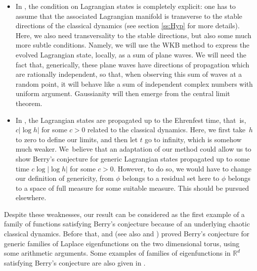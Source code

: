 \documentclass[10pt]{amsart}
\theoremstyle{plain}
\theoremstyle{definition}
\newcommand{\R}{\mathbb{R}}
\begin{document}
\begin{itemize}
\item In \cite{Schu}, the condition on Lagrangian states is completely explicit: one has to assume that the associated Lagrangian manifold is transverse to the stable directions of the classical dynamics (see section \ref{ss:Hyp} for more details). Here, we also need transversality to the stable directions, but also some much more subtle conditions. Namely, we will use the WKB method to express the evolved Lagrangian state, locally, as a sum of plane waves. We will need the fact that, generically, these plane waves have directions of propagation which are rationally independent, so that, when observing this sum of waves at a random point, it will behave like a sum of independent complex numbers with uniform argument. Gaussianity will then emerge from the central limit theorem.

\item In \cite{Schu}, the Lagrangian states are propagated up to the Ehrenfest time, that~is, $c |\log h|$ for some $c>0$ related to the classical dynamics. Here, we first take~$h$ to zero to define our limits, and then let $t$ go to infinity, which is somehow much weaker. We~believe that an adaptation of our method could allow us to show Berry's conjecture for generic Lagrangian states propagated up to some time $c \log |\log h|$ for some $c>0$. However, to do so, we would have to change our definition of genericity, from $\phi$ belongs to a residual set here to $\phi$ belongs to a space of full measure for some suitable measure. This should be pursued elsewhere.
\end{itemize}

Despite these weaknesses, our result can be considered as the first example of a family of functions satisfying Berry's conjecture because of an underlying chaotic classical dynamics. Before that, \cite{Bou} and \cite{BW} (see also \cite{LWL} and \cite{Sar}) proved Berry's conjecture for generic families of Laplace eigenfunctions on the two dimensional torus, using some arithmetic arguments. Some examples of families of eigenfunctions in $\R^d$ satisfying Berry's conjecture are also given in \cite{RomSar}.\enlargethispage{.5\baselineskip}%
\end{document}
